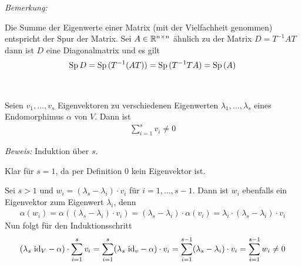 \textit{Bemerkung:}\medskip

Die Summe der Eigenwerte einer Matrix (mit der Vielfachheit genommen) entspricht der Spur der Matrix. Sei $A\in \mathbb{R}^{n \times n}$ ähnlich zu der 
Matrix $D=T^{-1}AT$ dann ist $D$ eine Diagonalmatrix und es gilt
\begin{align*}
    \text{Sp}\, D = \text{Sp}\, (T^{-1}(AT)) = \text{Sp}\, (T^{-1}TA) = \text{Sp}\, (A)
\end{align*}
\begin{mylemma}\label{lemdiag}\ \medskip

    Seien $v_1, \ldots, v_s$ Eigenvektoren zu verschiedenen Eigenwerten $\lambda_1, \ldots, \lambda_s$ eines Endomorphimus $\alpha$ von $V$. Dann ist
    \begin{align*}
        \sum_{i=1}^s v_i \neq 0
    \end{align*}

    \textit{Beweis:}
    Induktion über $s$.

    Klar für $s = 1$, da per Definition $0$ kein Eigenvektor ist.

    Sei $s > 1$ und $w_i = (\lambda_s - \lambda_i) \cdot v_i$ für $i = 1, \ldots, s-1$. Dann ist $w_i$ ebenfalls ein Eigenvektor zum Eigenwert $\lambda_i$, denn
    \begin{align*}
        \alpha(w_i) = \alpha((\lambda_s - \lambda_i) \cdot v_i)=(\lambda_s - \lambda_i) \cdot \alpha(v_i)= \lambda_i \cdot (\lambda_s - \lambda_i) \cdot v_i
    \end{align*}
    Nun folgt für den Induktionsschritt
    \begin{align*}
        (\lambda_s\mbox{ id}_V - \alpha)\cdot \sum_{i=1}^s v_i = \sum_{i=1}^s (\lambda_s\mbox{ id}_v - \alpha)\cdot v_i
        =\sum_{i=1}^{s-1} (\lambda_s-\lambda_i)\cdot v_i = \sum_{i=1}^{s-1} w_i \neq 0
    \end{align*}
\end{mylemma}

